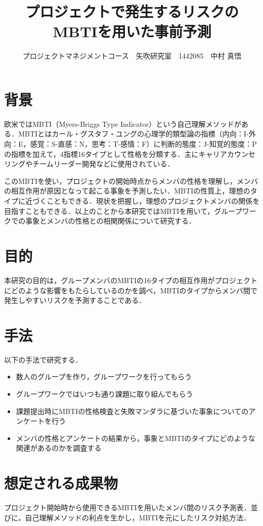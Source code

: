 \documentclass[uplatex,twocolumn,dvipdfmx]{jsarticle}
\title{\vspace{-5mm}\fontsize{14pt}{0pt}\selectfont プロジェクトで発生するリスクのMBTIを用いた事前予測}
\author{\normalsize プロジェクトマネジメントコース　矢吹研究室　1442085　中村 真悟}
\date{}
\begin{document}
\fontsize{10.5pt}{\baselineskip}\selectfont
\maketitle






\section{背景}
欧米ではMBTI（Myers-Briggs Type Indicator）という自己理解メソッドがある．MBTIとはカール・グスタフ・ユングの心理学的類型論の指標（内向：I-外向：E，感覚：S-直感：N，思考：T-感情：F）に判断的態度：J-知覚的態度：Pの指標を加えて，4指標16タイプとして性格を分類する．主にキャリアカウンセリングやチームリーダー開発などに使用されている．

このMBTIを使い，プロジェクトの開始時点からメンバの性格を理解し，メンバの相互作用が原因となって起こる事象を予測したい．MBTIの性質上，理想のタイプに近づくこともできる．現状を把握し，理想のプロジェクトメンバの関係を目指すこともできる．以上のことから本研究ではMBTIを用いて，グループワークでの事象とメンバの性格との相関関係について研究する．

\section{目的}
本研究の目的は，グループメンバのMBTIの16タイプの相互作用がプロジェクトにどのような影響をもたらしているのかを調べ，MBTIのタイプからメンバ間で発生しやすいリスクを予測することである．

\section{手法}
以下の手法で研究する．
\begin{itemize}
\item 数人のグループを作り，グループワークを行ってもらう
\item グループワークではいつも通り課題に取り組んでもらう
\item 課題提出時にMBTIの性格検査\cite{mbti}と失敗マンダラ\cite{110009915588}に基づいた事象についてのアンケートを行う
\item メンバの性格とアンケートの結果から，事象とMBTIのタイプにどのような関連があるのかを調査する
\end{itemize}
\section{想定される成果物}
プロジェクト開始時から使用できるMBTIを用いたメンバ間のリスク予測表．並びに，自己理解メソッドの利点を生かし，MBTIを元にしたリスク対処方法．
\end{document}
